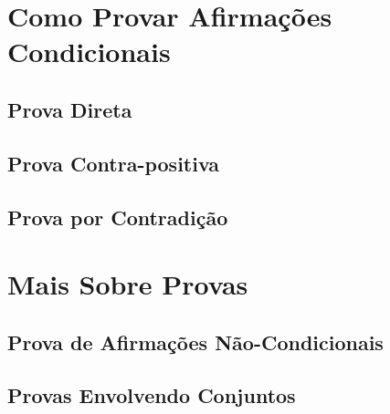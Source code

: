 \documentclass[a4paper,11pt]{book}
\theoremstyle{definition}
\begin{document}
\part{Como Provar Afirmações Condicionais}

\chapter{Prova Direta}

\chapter{Prova Contra-positiva}

\chapter{Prova por Contradição}


\part{Mais Sobre Provas}

\chapter{Prova de Afirmações Não-Condicionais}

\chapter{Provas Envolvendo Conjuntos}
\end{document}
